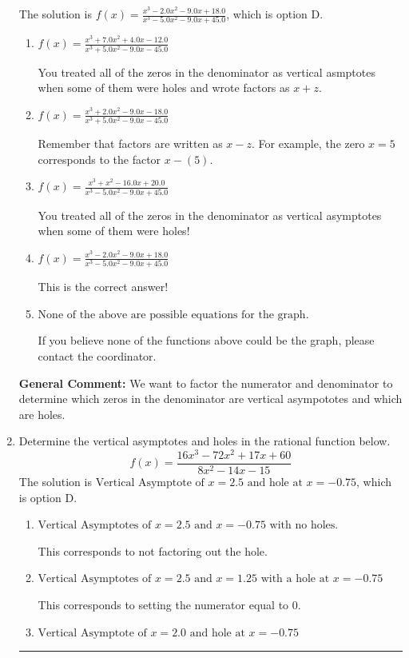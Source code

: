 \documentclass{extbook}[14pt]
\newcommand{\litem}[1]{\item #1

\rule{\textwidth}{0.4pt}}
\begin{document}
\begin{enumerate}
{The solution is \( f(x)=\frac{x^{3} -2.0 x^{2} -9.0 x + 18.0}{x^{3} -5.0 x^{2} -9.0 x + 45.0} \), which is option D.\begin{enumerate}[label=\Alph*.]
\item \( f(x)=\frac{x^{3} +7.0 x^{2} +4.0 x -12.0}{x^{3} +5.0 x^{2} -9.0 x -45.0} \)

You treated all of the zeros in the denominator as vertical asmptotes when some of them were holes and wrote factors as $x+z$.
\item \( f(x)=\frac{x^{3} +2.0 x^{2} -9.0 x -18.0}{x^{3} +5.0 x^{2} -9.0 x -45.0} \)

Remember that factors are written as $x-z$. For example, the zero $x=5$ corresponds to the factor $x-(5)$.
\item \( f(x)=\frac{x^{3} + x^{2} -16.0 x + 20.0}{x^{3} -5.0 x^{2} -9.0 x + 45.0} \)

You treated all of the zeros in the denominator as vertical asymptotes when some of them were holes!
\item \( f(x)=\frac{x^{3} -2.0 x^{2} -9.0 x + 18.0}{x^{3} -5.0 x^{2} -9.0 x + 45.0} \)

This is the correct answer!
\item \( \text{None of the above are possible equations for the graph.} \)

If you believe none of the functions above could be the graph, please contact the coordinator.
\end{enumerate}

\textbf{General Comment:} We want to factor the numerator and denominator to determine which zeros in the denominator are vertical asympototes and which are holes.
}
\litem{
Determine the vertical asymptotes and holes in the rational function below.
\[ f(x) = \frac{16x^{3} -72 x^{2} +17 x + 60}{8x^{2} -14 x -15} \]The solution is \( \text{Vertical Asymptote of } x = 2.5 \text{ and hole at } x = -0.75 \), which is option D.\begin{enumerate}[label=\Alph*.]
\item \( \text{Vertical Asymptotes of } x = 2.5 \text{ and } x = -0.75 \text{ with no holes.} \)

This corresponds to not factoring out the hole.
\item \( \text{Vertical Asymptotes of } x = 2.5 \text{ and } x = 1.25 \text{ with a hole at } x = -0.75 \)

This corresponds to setting the numerator equal to 0.
\item \( \text{Vertical Asymptote of } x = 2.0 \text{ and hole at } x = -0.75 \)


\end{enumerate}}
\end{enumerate}
\end{document}
